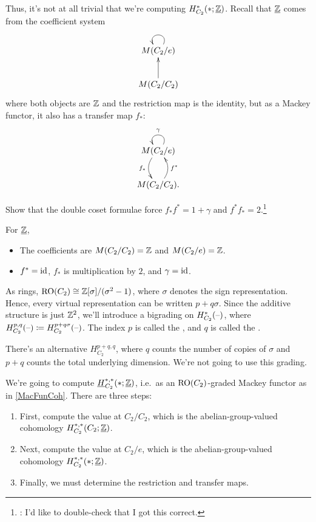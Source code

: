 Thus, it's not at all trivial that we're computing $H_{C_2}^*(*;\underline{\mathbb Z})$. Recall that $\underline{\mathbb Z}$ comes
from the coefficient system
\[\xymatrix{
	M(C_2/e)\ar@(ur,ul)_{}\\
	M(C_2/C_2)\ar[u],
}\]
where both objects are $\mathbb Z$ and the restriction map is the identity, but as a Mackey functor, it also has a
transfer map $f_*$:
\[\xymatrix{
	M(C_2/e)\ar@/_0.4cm/[d]_{f_*}\ar@(ur,ul)_\gamma\\
	M(C_2/C_2).\ar@/_0.4cm/[u]_{f^*}
}\]
\begin{ex}
Show that the double coset formulae force $f_*f^* = 1+\gamma$ and $f^*f_* = 2$.\footnote{\TODO: I'd like to
double-check that I got this correct.}
\end{ex}
For $\underline{\mathbb Z}$,
\begin{itemize}
	\item The coefficients are $M(C_2/C_2) = \mathbb Z$ and $M(C_2/e) = \mathbb Z$.
	\item $f^* = \mathrm{id}$, $f_*$ is multiplication by $2$, and $\gamma = \mathrm{id}$.
\end{itemize}
As rings, $\mathrm{RO}(C_2)\cong\mathbb Z[\sigma]/(\sigma^2-1)$, where $\sigma$ denotes the sign representation. Hence, every virtual representation can be written $p+q\sigma$. Since
the additive structure is just $\mathbb Z^2$, we'll introduce a bigrading on $H^*_{C_2}(\text{--})$, where $H_{C_2}^{p,q}(\text{--})
\coloneqq H_{C_2}^{p+q\sigma}(\text{--})$. The index $p$ is called the
, and $q$ is called the
.
\begin{rem}
There's an alternative  $H_{C_2}^{p+q,q}$, where $q$ counts
the number of copies of $\sigma$ and $p+q$ counts the total underlying dimension. We're not going to use this
grading.
\end{rem}
We're going to compute $\underline H_{C_2}^{*,*}(*;\underline{\mathbb Z})$, i.e.\ as an $\mathrm{RO}(C_2)$-graded Mackey functor as
in \cref{MacFunCoh}. There are three steps:
\begin{enumerate}
	\item\label{atC_2} First, compute the value at $C_2/C_2$, which is the abelian-group-valued cohomology
	$H_{C_2}^{*,*}(C_2;\underline{\mathbb Z})$.
	\item\label{ate} Next, compute the value at $C_2/e$, which is the abelian-group-valued cohomology
	$H_{C_2}^{*,*}(*;\underline{\mathbb Z})$.
	\item Finally, we must determine the restriction and transfer maps.
\end{enumerate}
